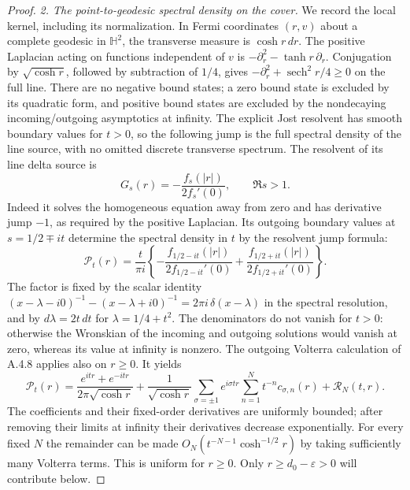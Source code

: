 \begin{proof}
\emph{2. The point-to-geodesic spectral density on the cover.}
We record the local kernel, including its normalization.
In Fermi coordinates $(r,v)$ about a complete geodesic in
$\mathbb H^2$, the transverse measure is $\cosh r\,dr$.
The positive Laplacian acting on functions independent of $v$
is $-\partial_r^2-\tanh r\,\partial_r$.
Conjugation by $\sqrt{\cosh r}$, followed by subtraction of $1/4$,
gives $-\partial_r^2+\operatorname{sech}^2r/4\geq0$ on the full line.
There are no negative bound states; a zero bound state is excluded
by its quadratic form, and positive bound states are excluded by
the nondecaying incoming/outgoing asymptotics at infinity.
The explicit Jost resolvent has smooth boundary values for $t>0$,
so the following jump is the full spectral density of the line
source, with no omitted discrete transverse spectrum.
The resolvent of its line delta source is
\[
 G_s(r)=-\frac{f_s(|r|)}{2f_s'(0)},\qquad \Re s>1.
\]
Indeed it solves the homogeneous equation away from zero and has
derivative jump $-1$, as required by the positive Laplacian.
Its outgoing boundary values at $s=1/2\mp it$ determine the
spectral density in $t$ by the resolvent jump formula:
\begin{equation}\label{A:line-spectral-density}
 \mathcal P_t(r)=
 \frac{t}{\pi i}
 \left\{-\frac{f_{1/2-it}(|r|)}{2f_{1/2-it}'(0)}
       +\frac{f_{1/2+it}(|r|)}{2f_{1/2+it}'(0)}\right\}.
\end{equation}
The factor is fixed by the scalar identity
$(x-\lambda-i0)^{-1}-(x-\lambda+i0)^{-1}
 =2\pi i\,\delta(x-\lambda)$ in the spectral resolution,
and by $d\lambda=2t\,dt$ for $\lambda=1/4+t^2$.
The denominators do not vanish for $t>0$: otherwise the
Wronskian of the incoming and outgoing solutions would vanish
at zero, whereas its value at infinity is nonzero.
The outgoing Volterra calculation of A.4.8 applies also on $r\geq0$.
It yields
\begin{equation}\label{A:line-spectral-principal}
 \mathcal P_t(r)=
 \frac{e^{itr}+e^{-itr}}{2\pi\sqrt{\cosh r}}
 +\frac1{\sqrt{\cosh r}}
       \sum_{\sigma=\pm1}e^{i\sigma tr}
           \sum_{n=1}^{N}t^{-n}c_{\sigma,n}(r)
 +\mathcal R_N(t,r).
\end{equation}
The coefficients and their fixed-order derivatives are uniformly
bounded; after removing their limits at infinity their derivatives
decrease exponentially.
For every fixed $N$ the remainder can be made
$O_N(t^{-N-1}\cosh^{-1/2}r)$ by taking sufficiently many Volterra
terms. This is uniform for $r\geq0$.
Only $r\geq d_0-\varepsilon>0$ will contribute below.


\end{proof}
